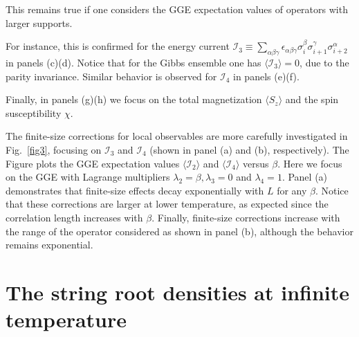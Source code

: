 \documentclass[twocolumn,superscriptaddress,prb,10pt]{revtex4-1}
\begin{document}
This remains true if one considers the GGE expectation values of operators with larger 
supports. 

For instance, this is confirmed for the energy current ${\mathcal I}_3\equiv\sum_{\alpha\beta\gamma}
\epsilon_{\alpha\beta\gamma}\sigma^\beta_i\sigma^\gamma_{i+1}\sigma^\alpha_{i+2}$ in 
panels (c)(d). Notice that for the Gibbs ensemble one has $\langle {\mathcal I}_3\rangle=0$, 
due to the parity invariance. Similar behavior is observed for ${\mathcal I}_4$ in panels (e)(f). 

Finally, in panels (g)(h) we focus on the total magnetization $\langle S_z\rangle$ and the spin 
susceptibility $\chi$. 


The finite-size corrections for local observables are more carefully investigated 
in Fig.~\ref{fig3}, focusing on ${\mathcal I}_3$ and ${\mathcal I}_4$ (shown in 
panel (a) and (b), respectively). The Figure plots the GGE expectation values 
$\langle{\mathcal I}_2\rangle$ and $\langle {\mathcal I}_4\rangle$ versus $\beta$. 
Here we focus on the GGE with Lagrange multipliers $\lambda_2=\beta,\lambda_3=0$ 
and $\lambda_4=1$. Panel (a) demonstrates that finite-size effects decay 
exponentially with $L$ for any $\beta$. Notice that these corrections are 
larger at lower temperature, as expected since the correlation length 
increases with $\beta$. Finally, finite-size corrections increase with the 
range of the operator considered as shown in panel (b), although the 
behavior remains exponential. 






\section{The string root densities at infinite temperature}
\end{document}

